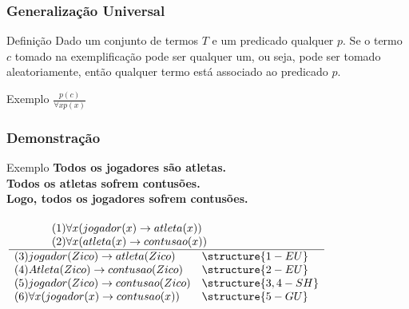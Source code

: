 \documentclass{beamer}
\begin{document}
\begin{frame}
\frametitle{Generalização Universal}

\begin{block}{Definição}
Dado um conjunto de termos $T$ e um predicado qualquer $p$. Se o termo $c$ tomado na exemplificação pode ser qualquer um, ou seja, pode ser tomado
aleatoriamente, então qualquer termo está associado ao predicado $p$.
\end{block}\vfill

\begin{exampleblock}{Exemplo}
	\Large
		$\frac{p(c)}{ \forall x p(x)}$
\end{exampleblock}
\end{frame}

\begin{frame}
\frametitle{Demonstração}

\begin{exampleblock}{Exemplo}
	\textbf{Todos os jogadores são atletas.}\\
	\textbf{Todos os atletas sofrem contusões.}\\
	\textbf{Logo, todos os jogadores sofrem contusões.}\\~\\

	$\frac{
		     \begin{array}{ll} 
			(1) \forall x (jogador(x) \rightarrow atleta(x)) &~~~~~~~~~~~~~~~~~\\ 
			(2) \forall x (atleta(x) \rightarrow contusao(x)) &
			\end{array}
		    }{
		    \begin{array}{ll} 
		    (3) jogador(Zico) \rightarrow atleta(Zico) & \structure{1 - EU}  \\ 
		    (4)  Atleta(Zico) \rightarrow contusao(Zico) & \structure{2 - EU}  \\ 
		    (5)  jogador(Zico) \rightarrow contusao(Zico)& \structure{3,4 - SH}  \\ 
		    (6)  \forall x(jogador(x) \rightarrow contusao(x)) & \structure{5 - GU}
		   \end{array}}$
\end{exampleblock}
\end{frame}
\end{document}
